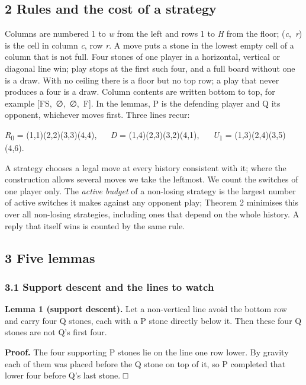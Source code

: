 \documentclass[
  a4paper,
]{article}
\begin{document}
\subsection{2 Rules and the cost of a
strategy}\label{rules-and-the-cost-of-a-strategy}

Columns are numbered 1 to \emph{w} from the left and rows 1 to \emph{H}
from the floor; (\emph{c},~\emph{r}) is the cell in column \emph{c}, row
\emph{r}. A move puts a stone in the lowest empty cell of a column that
is not full. Four stones of one player in a horizontal, vertical or
diagonal line win; play stops at the first such four, and a full board
without one is a draw. With no ceiling there is a floor but no top row;
a play that never produces a four is a draw. Column contents are written
bottom to top, for example {[}FS,~∅,~∅,~F{]}. In the lemmas, P is the
defending player and Q its opponent, whichever moves first. Three lines
recur:

\emph{R}\textsubscript{0} = (1,1)(2,2)(3,3)(4,4), ~~ \emph{D} =
(1,4)(2,3)(3,2)(4,1), ~~ \emph{U}\textsubscript{1} =
(1,3)(2,4)(3,5)(4,6).

A strategy chooses a legal move at every history consistent with it;
where the construction allows several moves we take the leftmost. We
count the switches of one player only. The \emph{active budget} of a
non-losing strategy is the largest number of active switches it makes
against any opponent play; Theorem 2 minimises this over all non-losing
strategies, including ones that depend on the whole history. A reply
that itself wins is counted by the same rule.

\subsection{3 Five lemmas}\label{five-lemmas}

\subsubsection{3.1 Support descent and the lines to
watch}\label{support-descent-and-the-lines-to-watch}

\textbf{Lemma 1 (support descent).} Let a non-vertical line avoid the
bottom row and carry four Q stones, each with a P stone directly below
it. Then these four Q stones are not Q's first four.

\textbf{Proof.} The four supporting P stones lie on the line one row
lower. By gravity each of them was placed before the Q stone on top of
it, so P completed that lower four before Q's last stone. □
\end{document}
